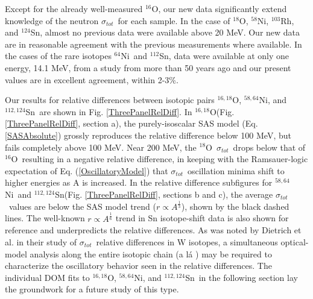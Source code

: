 \documentclass[twocolumn,secnumarabic,amssymb, nobibnotes, aps, prl,
superscriptaddress, nobalancelastpage, draft]{revtex4}
\newcommand{\tot}{\ensuremath{\sigma_{tot}}}
\newcommand{\oSix}{\ensuremath{^{16}}O}
\newcommand{\oEight}{\ensuremath{^{18}}O}
\newcommand{\oSixEight}{\ensuremath{^{16,18}}O}
\newcommand{\niEight}{\ensuremath{^{58}}N\lowercase{i}}
\newcommand{\niFour}{\ensuremath{^{64}}N\lowercase{i}}
\newcommand{\niEightFour}{\ensuremath{^{58,64}}N\lowercase{i}}
\newcommand{\rhThree}{\ensuremath{^{103}}R\lowercase{h}}
\newcommand{\snTwelve}{\ensuremath{^{112}}S\lowercase{n}}
\newcommand{\snFour}{\ensuremath{^{124}}S\lowercase{n}}
\newcommand{\snTwelveFour}{\ensuremath{^{112,124}}S\lowercase{n}}
\begin{document}
Except for the already well-measured \oSix, our new data significantly
extend knowledge of the neutron \tot\ for each sample. In the case of \oEight,
\niEight, \rhThree, and \snFour, almost no previous data were available
above 20 MeV. Our new data are in reasonable agreement with the previous
measurements where available. In the cases of the rare isotopes \niFour\ and \snTwelve,
data were available at only one energy, 14.1 MeV, from a study from more than 50
years ago \cite{Dukarevich1967} and our present values are in excellent agreement, within 2-3\%.

Our results for relative differences between isotopic pairs \oSixEight,
\niEightFour, and \snTwelveFour\ are shown in Fig. \ref{ThreePanelRelDiff}. In
\oSixEight (Fig. \ref{ThreePanelRelDiff}, section a), the purely-isoscalar
SAS model (Eq.  \ref{SASAbsolute}) grossly reproduces the relative
difference below 100 MeV, but fails completely above 100 MeV. Near 200
MeV, the \oEight\ \tot\ drops below that of \oSix\ resulting in a negative
relative difference, in keeping with the Ramsauer-logic expectation of Eq.
(\ref{OscillatoryModel}) that \tot\ oscillation minima shift to higher
energies as A is increased. In the relative difference subfigures for 
\niEightFour\ and \snTwelveFour (Fig. \ref{ThreePanelRelDiff}, sections b and c),
the average \tot\ values are below the
SAS model trend ($r \propto A^{\frac{1}{3}}$), shown by the black dashed lines. 
The well-known $r \propto A^{\frac{1}{6}}$ trend in Sn isotope-shift data 
\cite{Anselment1986} is also shown for reference and
underpredicts the relative differences. As was noted by Dietrich et al. in
their study of \tot\ relative differences in W isotopes, a simultaneous optical-model
analysis along the entire isotopic chain (a l\'a \cite{Mueller2011})
may be required to characterize the oscillatory behavior seen in the relative differences.
The individual DOM fits to \oSixEight, \niEightFour, and
\snTwelveFour\ in the following section lay the groundwork for a future study of
this type.
\end{document}
